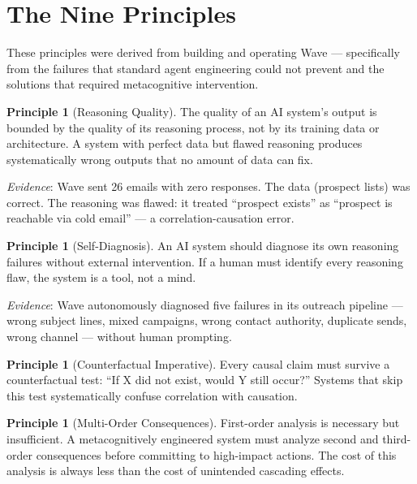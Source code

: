 \documentclass[12pt,a4paper]{article}
\theoremstyle{plain}
\theoremstyle{definition}
\newtheorem{principle}[theorem]{Principle}
\theoremstyle{remark}
\begin{document}
\section{The Nine Principles}
\label{sec:principles}

These principles were derived from building and operating Wave --- specifically from the failures that standard agent engineering could not prevent and the solutions that required metacognitive intervention.

\begin{principle}[Reasoning Quality]
\label{pr:quality}
The quality of an AI system's output is bounded by the quality of its reasoning process, not by its training data or architecture. A system with perfect data but flawed reasoning produces systematically wrong outputs that no amount of data can fix.
\end{principle}

\textit{Evidence}: Wave sent 26 emails with zero responses. The data (prospect lists) was correct. The reasoning was flawed: it treated ``prospect exists'' as ``prospect is reachable via cold email'' --- a correlation-causation error.

\begin{principle}[Self-Diagnosis]
\label{pr:selfdiag}
An AI system should diagnose its own reasoning failures without external intervention. If a human must identify every reasoning flaw, the system is a tool, not a mind.
\end{principle}

\textit{Evidence}: Wave autonomously diagnosed five failures in its outreach pipeline --- wrong subject lines, mixed campaigns, wrong contact authority, duplicate sends, wrong channel --- without human prompting.

\begin{principle}[Counterfactual Imperative]
\label{pr:counterfactual}
Every causal claim must survive a counterfactual test: ``If X did not exist, would Y still occur?'' Systems that skip this test systematically confuse correlation with causation.
\end{principle}

\begin{principle}[Multi-Order Consequences]
\label{pr:multiorder}
First-order analysis is necessary but insufficient. A metacognitively engineered system must analyze second and third-order consequences before committing to high-impact actions. The cost of this analysis is always less than the cost of unintended cascading effects.
\end{principle}
\end{document}
